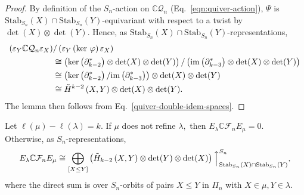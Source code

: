 \documentclass[ALCO, Unicode]{cedram}
\def \ker{\mathrm{ker}}
\def \im{\mathrm{im}}
\def\C{{\mathbb{C}}}
\def\stab{\mathrm{Stab}}
\begin{document}
\begin{proof}
By definition of the $S_n$-action on $\C \mathcal{Q}_n$ (Eq.~\eqref{eqn:quiver-action}), $\Psi$ is $\stab_{S_n}(X) \cap \stab_{S_n}(Y)$-equivariant with respect to a twist by $\det(X) \otimes \det(Y).$ Hence, as $\stab_{S_n}(X) \cap \stab_{S_n}(Y)$-representations, 
    \begin{align*}
        \left(\varepsilon_Y \C \mathcal{Q}_n \varepsilon_X \right)&/\left(\varepsilon_Y \left(\ker \ \varphi \right) \varepsilon_X\right)\\ &\cong \left(\ker\left(\partial_{k - 2}^\ast\right)\otimes \det(X) \otimes \det(Y)\right) / \left(\im\left(\partial_{k - 3}^\ast\right)\otimes \det(X) \otimes \det(Y)\right)\\
        &\cong  \left(\ker\left(\partial_{k - 2}^\ast\right) / \im\left(\partial_{k - 3}^\ast \right)\right)\otimes \det(X) \otimes \det(Y) \\
        &\cong \Tilde{H}^{k - 2}\left(X, Y\right) \otimes \det(X) \otimes \det(Y).
    \end{align*}
    The lemma then follows from Eq.~\eqref{quiver-double-idem-spaces}.
\end{proof}

\begin{coro}\label{cor:induced-cohomology}
   Let $\ell(\mu) - \ell(\lambda) = k.$ If $\mu$ does not refine $\lambda,$ then $E_\lambda \C \mathcal{F}_n E_\mu = 0.$ Otherwise, as $S_n$-representations,
    \begin{align*}
        E_{\lambda}\C \mathcal{F}_nE_{\mu} \cong \bigoplus_{ [X \leq Y]} \left(\Tilde{H}_{k - 2}\left(X, Y\right) \otimes \det(Y) \otimes \det(X)\right)\Big\uparrow_{\stab_{S_n}(X) \cap \stab_{S_n}(Y)}^{S_n},
    \end{align*}
     where the direct sum is over $S_n$-orbits of pairs $X \leq Y$ in $\Pi_n$ with $X \in \mu, Y \in \lambda.$
\end{coro}
\end{document}
